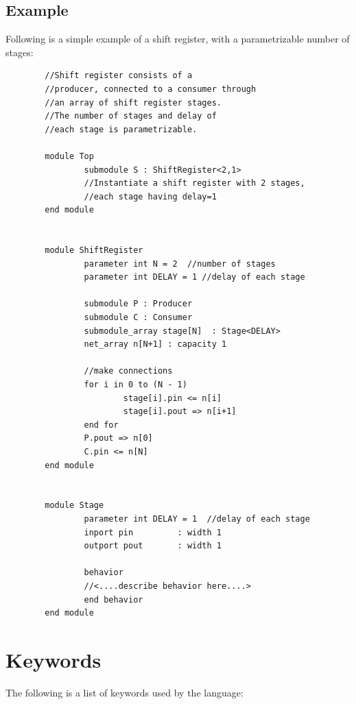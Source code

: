 \documentclass[12pt,a4paper]{report}
\begin{document}
	\subsection{Example}
	Following is a simple example of a shift register, with a parametrizable number of stages:
	\begin{verbatim}
        //Shift register consists of a
        //producer, connected to a consumer through 
        //an array of shift register stages.
        //The number of stages and delay of 
        //each stage is parametrizable.

        module Top
                submodule S : ShiftRegister<2,1> 
                //Instantiate a shift register with 2 stages,
                //each stage having delay=1
        end module


        module ShiftRegister 
                parameter int N = 2  //number of stages
                parameter int DELAY = 1 //delay of each stage
                
                submodule P : Producer
                submodule C : Consumer
                submodule_array stage[N]  : Stage<DELAY>
                net_array n[N+1] : capacity 1

                //make connections
                for i in 0 to (N - 1)
                        stage[i].pin <= n[i]
                        stage[i].pout => n[i+1]
                end for
                P.pout => n[0]
                C.pin <= n[N]
        end module
                        

        module Stage
                parameter int DELAY = 1  //delay of each stage
                inport pin         : width 1
                outport pout       : width 1
                
                behavior 
                //<....describe behavior here....>
                end behavior
        end module

	\end{verbatim}

\section{Keywords}\label{sec:keywords}
The following is a list of keywords used by the language:
	
\end{document}
